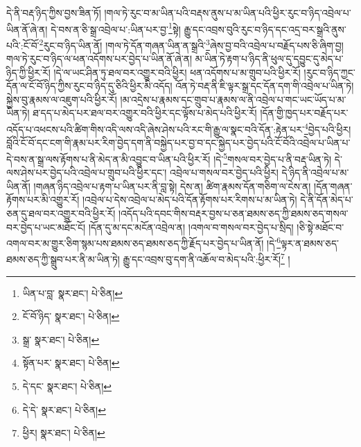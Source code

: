 དེ་ནི་བརྡ་ཉིད་ཀྱིས་བྱས་ཟིན་ཏོ། །གལ་ཏེ་རུང་བ་མ་ཡིན་པའི་བརྡས་ནུས་པ་མ་ཡིན་པའི་ཕྱིར་རུང་བ་ཉིད་འབྲེལ་པ་ཡིན་ནོ་ཞེ་ན། དེ་བས་ན་ཅི་སྒྲ་འབྲེལ་པ་:ཡིན་པར་བྱ་\footnote{ཡིན་པ་བླ་  སྣར་ཐང་།  པེ་ཅིན། }སྟེ། རྒྱུ་དང་འབྲས་བུའི་རུང་བ་ཉིད་དང་འདྲ་བར་སྒྲའི་ནུས་པའི་:ངོ་བོ་\footnote{ངོ་བོ་ཉིད་  སྣར་ཐང་།  པེ་ཅིན། }རུང་བ་ཉིད་ཡིན་ནོ། །གལ་ཏེ་དོན་གཞན་ཡིན་ན་སྒྲའི་\footnote{སྒྲ་  སྣར་ཐང་།  པེ་ཅིན། }ཞེས་བྱ་བའི་འབྲེལ་པ་བརྗོད་པས་ཅི་ཞིག་བྱ། གལ་ཏེ་རུང་བ་ཉིད་ལ་ཕན་འདོགས་པར་བྱེད་པ་ཡིན་ནོ་ཞེ་ན། མ་ཡིན་ཏེ་རྟག་པ་ཉིད་ནི་ཕུལ་དུ་དབྱུང་དུ་མེད་པ་ཉིད་ཀྱི་ཕྱིར་རོ། །དེ་ལ་ཡང་ཤིན་ཏུ་ཐལ་བར་འགྱུར་བའི་ཕྱིར། ཕན་འདོགས་པ་མ་གྲུབ་པའི་ཕྱིར་རོ། །རུང་བ་ཉིད་ཀྱང་དོན་ལ་ངོ་བོ་ཉིད་ཀྱིས་རུང་བ་ཉིད་དུ་ཅིའི་ཕྱིར་མི་འདོད། འོན་ཏེ་བརྡ་ནི་ཇི་ལྟར་སྒྲ་དང་དོན་དག་གི་འབྲེལ་པ་ཡིན་ཏེ། སྐྱེས་བུ་རྣམས་ལ་འཇུག་པའི་ཕྱིར་རོ། །མ་འདྲེས་པ་རྣམས་དང་གྲུབ་པ་རྣམས་ལ་ནི་འབྲེལ་པ་གང་ཡང་ཡོད་པ་མ་ཡིན་ཏེ། ཐ་དད་པ་མེད་པར་ཐལ་བར་འགྱུར་བའི་ཕྱིར་དང་ལྟོས་པ་མེད་པའི་ཕྱིར་རོ། །དོན་གྱི་ཁྱད་པར་བརྗོད་པར་འདོད་པ་འཕངས་པའི་ཚིག་གིས་འདི་ལས་འདི་ཞེས་ཤེས་པའི་རང་གི་རྒྱུ་ལ་སྣང་བའི་དོན་:རྟེན་པར་\footnote{སྟོན་པར་  སྣར་ཐང་།  པེ་ཅིན། }བྱེད་པའི་ཕྱིར། བློའི་ངོ་བོ་དང་ངག་གི་རྣམ་པར་རིག་བྱེད་དག་ནི་བསྐྱེད་པར་བྱ་བ་དང་སྐྱེད་པར་བྱེད་པའི་ངོ་བོའི་འབྲེལ་པ་ཡིན་པ་དེ་བས་ན་སྒྲ་ལས་རྟོགས་པ་ནི་མེད་ན་མི་འབྱུང་བ་ཡིན་པའི་ཕྱིར་རོ། །དེ་\footnote{དེ་དང་  སྣར་ཐང་།  པེ་ཅིན། }གསལ་བར་བྱེད་པ་ནི་བརྡ་ཡིན་ཏེ། དེ་ལས་ཤེས་པར་བྱེད་པའི་འབྲེལ་པ་གྲུབ་པའི་ཕྱིར་དང་། འབྲེལ་པ་གསལ་བར་བྱེད་པའི་ཕྱིར། དེ་ཉིད་ནི་འབྲེལ་པ་མ་ཡིན་ནོ། །གཞན་ཉིད་འབྲེལ་པ་རྟག་པ་ཡིན་པར་ནི་བླ་སྟེ། དེས་ན། ཚིག་རྣམས་དོན་གཅིག་ལ་ངེས་ན། །དོན་གཞན་རྟོགས་པར་མི་འགྱུར་རོ། །འབྲེལ་པ་དེས་འབྲེལ་པ་མེད་པའི་དོན་རྟོགས་པར་རིགས་པ་མ་ཡིན་ཏེ། དེ་ནི་དོན་མེད་པ་ཅན་དུ་ཐལ་བར་འགྱུར་བའི་ཕྱིར་རོ། །འདོད་པའི་དབང་གིས་བརྡར་བྱས་པ་ཅན་ཐམས་ཅད་ཀྱི་ཐམས་ཅད་གསལ་བར་བྱེད་པ་ཡང་མཐོང་ངོ། །དོན་དུ་མ་དང་མངོན་འབྲེལ་ན། །འགལ་བ་གསལ་བར་བྱེད་པ་སྲིད། །ཅི་སྟེ་མཐོང་བ་འགལ་བར་མ་གྱུར་ཅིག་སྙམ་པས་ཐམས་ཅད་ཐམས་ཅད་ཀྱི་རྗོད་པར་བྱེད་པ་ཡིན་ནོ། །དེ་\footnote{དེ་དེ་  སྣར་ཐང་།  པེ་ཅིན། }ལྟར་ན་ཐམས་ཅད་ཐམས་ཅད་ཀྱི་སྒྲུབ་པར་ནི་མ་ཡིན་ཏེ། རྒྱུ་དང་འབྲས་བུ་དག་ནི་འཆོལ་བ་མེད་པའི་:ཕྱིར་རོ།\footnote{ཕྱིར།  སྣར་ཐང་།  པེ་ཅིན། } །
